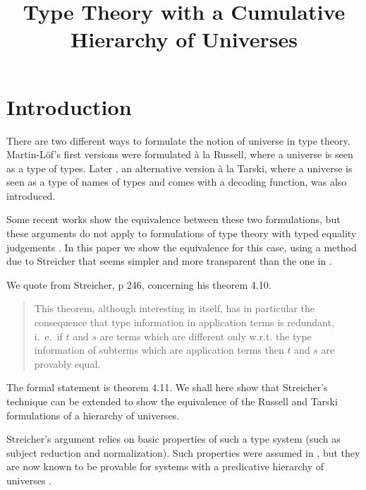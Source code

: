 \documentclass[11pt,a4paper]{article}
\theoremstyle{definition}
\begin{document}
\title{Type Theory with a Cumulative Hierarchy of Universes}

\author{}
\date{}
\maketitle


\section{Introduction}\label{sec:intros}

 There are two different ways to formulate the notion of universe in type theory. Martin-Löf's first versions \cite{martinlof:72,martinlof:predicative,martinlof:hannover,martinlof:padova} were formulated \`a la Russell, where a universe is seen as a type of types. Later \cite{martinlof:padova}, an alternative version \`a la Tarski, where a universe is seen as a type of names of types and comes with a decoding function, was also introduced.
 
Some recent works \cite{Assaf14,Thire20} show the equivalence between these two formulations, but these arguments do not apply to formulations of type theory with typed equality judgements \cite{martinlof:hannover,martinlof:padova}. In this paper we show the equivalence for this case, using a method due to Streicher  \cite{Streicher:semtt} that seems simpler
and more transparent than the one in \cite{Assaf14,Thire20}.

We quote from Streicher, p 246, concerning his theorem 4.10.
\begin{quotation}
This theorem, although interesting in itself, has in particular the consequence that type information in application terms is redundant, i.~e.~if $t$ and $s$ are terms which are different only w.r.t. the type information of subterms which are application terms then $t$ and $s$ are provably equal.
\end{quotation}
The formal statement is theorem 4.11. We shall here show that Streicher's technique can be extended to show the equivalence of the Russell and Tarski formulations of a hierarchy of universes.

Streicher's argument relies on  basic properties of such a type system (such as subject reduction and normalization). Such properties were assumed in \cite{Streicher:semtt}, but they are now known to be provable
for systems with a predicative hierarchy of universes \cite{coquand:sophia,abel:neworleans,abel:wroclaw,coq18}.
\end{document}
